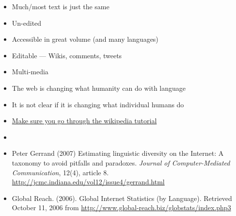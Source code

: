 \documentclass[a4paper,landscape,headrule,footrule,xetex]{foils}
\begin{document}

\begin{itemize}
\item Much/most text is just the same
\item Un-edited
\item Accessible in great volume (and many languages)
\item Editable --- Wikis, comments, tweets
\item Multi-media
\end{itemize}


\begin{itemize}
\item The web is changing what humanity can do with language
\item It is not clear if it is changing what individual humans do
\bigskip
\item \href{https://en.wikipedia.org/wiki/Wikipedia:Tutorial}{Make sure you go through the wikipedia tutorial}
\end{itemize}




\begin{itemize}
\item {}
\item Peter Gerrand (2007) Estimating linguistic diversity on the
  Internet: A taxonomy to avoid pitfalls and
  paradoxes. \textit{Journal of Computer-Mediated Communication},
  12(4), article
  8. \url{http://jcmc.indiana.edu/vol12/issue4/gerrand.html}
\item Global Reach. (2006). Global Internet Statistics (by
  Language). Retrieved October 11, 2006 from
  \url{http://www.global-reach.biz/globstats/index.php3}
\end{itemize}

\end{document}

